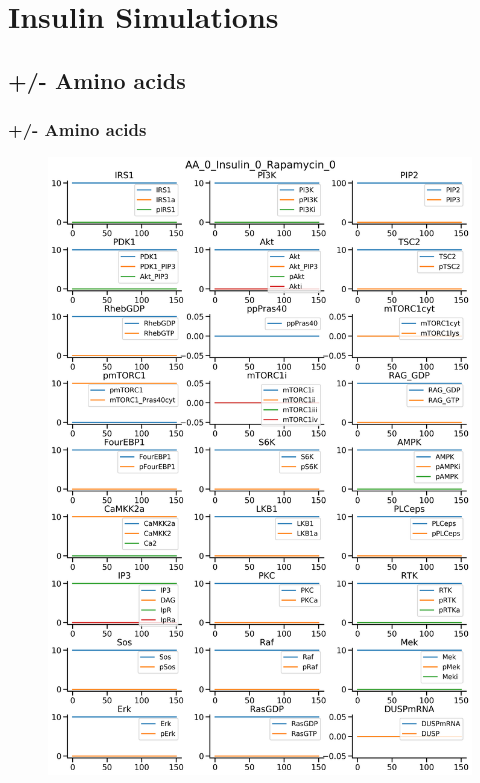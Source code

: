 \documentclass{beamer}
\begin{document}
\section{Insulin Simulations} %

\subsection{+/- Amino acids} %
\begin{frame}
\frametitle{+/- Amino acids }
\begin{figure}
    \begin{minipage}{0.45\textwidth}
        \centering
        \includegraphics[width=\textwidth]{../simulations/ExtendedPI3KModel/validations/AAWithInsulinWithRapamycin/AA_0_Insulin_0_Rapamycin_0-0.png}

\end{minipage}
\end{figure}
\end{frame}
\end{document}
